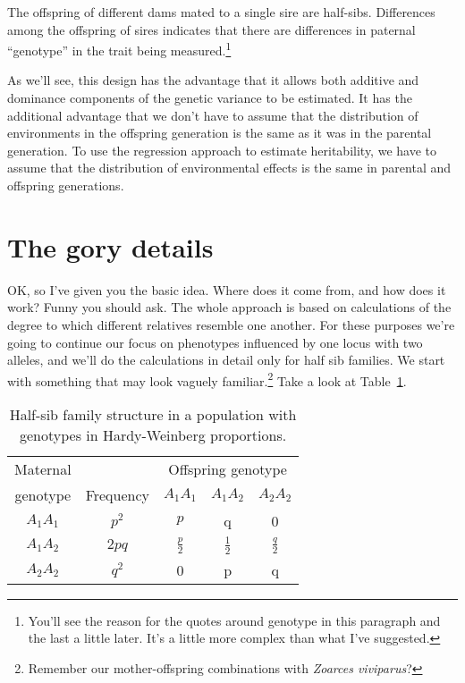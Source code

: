 \documentclass[12pt]{article}
\begin{document}
The offspring of different dams mated to a single sire are
half-sibs. Differences among the offspring of sires indicates that
there are differences in paternal ``genotype'' in the trait being
measured.\footnote{You'll see the reason for the quotes around
  genotype in this paragraph and the last a little later. It's a
  little more complex than what I've suggested.}

As we'll see, this design has the advantage that it allows both
additive and dominance components of the genetic variance to be
estimated. It has the additional advantage that we don't have to
assume that the distribution of environments in the offspring
generation is the same as it was in the parental generation. To use
the regression approach to estimate heritability, we have to assume
that the distribution of environmental effects is the same in parental
and offspring generations.

\section*{The gory details}

OK, so I've given you the basic idea. Where does it come from, and how
does it work? Funny you should ask. The whole approach is based on
calculations of the degree to which different relatives resemble one
another. For these purposes we're going to continue our focus on
phenotypes influenced by one locus with two alleles, and we'll do the
calculations in detail only for half sib families. We start with
something that may look vaguely familiar.\footnote{Remember our
  mother-offspring combinations with {\it Zoarces viviparus\/}?} Take
a look at Table~\ref{table:half-sib}.

\begin{table}
\begin{center}
\begin{tabular}{c|c|ccc}
\hline\hline
Maternal &           & \multicolumn{3}{c}{Offspring genotype} \\
genotype & Frequency & $A_1A_1$      & $A_1A_2$      & $A_2A_2$ \\
\hline
$A_1A_1$ & $p^2$     & $p$           & q             & 0 \\
$A_1A_2$ & $2pq$     & $\frac{p}{2}$ & $\frac{1}{2}$ & $\frac{q}{2}$ \\
$A_2A_2$ & $q^2$     & 0             & p             & q \\
\hline
\end{tabular}
\end{center}
\caption{Half-sib family structure in a population with genotypes in
  Hardy-Weinberg proportions.}\label{table:half-sib}
\end{table}
\end{document}
